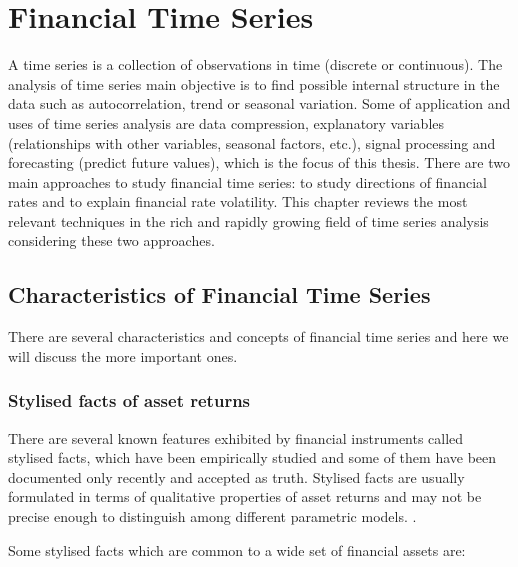 
\chapter{Financial Time Series}
\label{chapter:FTT}

\vspace{0.5cm} 
 
A time series is a collection of observations in time (discrete or continuous).
The analysis of time series main objective is to find possible internal
structure in the data such as autocorrelation, trend or seasonal variation.
Some of application and uses of time series analysis are data compression,
explanatory variables (relationships with other variables, seasonal factors,
etc.), signal processing and forecasting (predict future values), which is the
focus of this thesis.  There are two main approaches to study financial time
series: to study directions of financial rates and to explain financial rate
volatility.  This chapter reviews the most relevant techniques in the rich and
rapidly growing field of time series analysis considering these two approaches.


\section{Characteristics of Financial Time Series}
There are several characteristics and concepts of financial time series and here
we will discuss the more important ones.
\subsection{Stylised facts of asset returns}
\label{sec:stylisedfacts}

There are several known features exhibited by financial instruments called
stylised facts, which have been empirically studied and some of them have been
documented only recently and accepted as truth. Stylised facts are usually
formulated in terms of qualitative properties of asset returns and may not be
precise enough to distinguish among different parametric models.
\cite{cont2001}.

Some stylised facts which are common to a wide set of financial assets
\cite{sewell2011} are:

